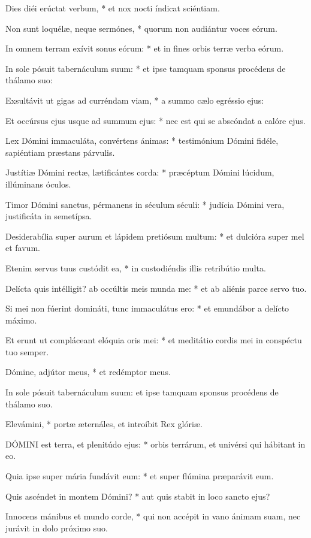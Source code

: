 Dies diéi erúctat verbum, * et nox nocti índicat sciéntiam.

Non sunt loquélæ, neque sermónes, * quorum non audiántur voces eórum.

In omnem terram exívit sonus eórum: * et in fines orbis terræ verba eórum.

In sole pósuit tabernáculum suum: * et ipse tamquam sponsus procédens de thálamo suo:

Exsultávit ut gigas ad curréndam viam, * a summo cælo egréssio ejus:

Et occúrsus ejus usque ad summum ejus: * nec est qui se abscóndat a calóre ejus.

Lex Dómini immaculáta, convértens ánimas: * testimónium Dómini fidéle, sapiéntiam præstans párvulis.

Justítiæ Dómini rectæ, lætificántes corda: * præcéptum Dómini lúcidum, illúminans óculos.

Timor Dómini sanctus, pérmanens in séculum séculi: * judícia Dómini vera, justificáta in semetípsa.

Desiderabília super aurum et lápidem pretiósum multum: * et dulcióra super mel et favum.

Etenim servus tuus custódit ea, * in custodiéndis illis retribútio multa.

Delícta quis intélligit? ab occúltis meis munda me: * et ab aliénis parce servo tuo.

Si mei non fúerint domináti, tunc immaculátus ero: * et emundábor a delícto máximo.

Et erunt ut compláceant elóquia oris mei: * et meditátio cordis mei in conspéctu tuo semper.

Dómine, adjútor meus, * et redémptor meus.

 In sole pósuit tabernáculum suum: et ipse tamquam sponsus procédens de thálamo suo.

 Elevámini, * portæ æternáles, et introíbit Rex glóriæ.


\lettrine[lines=2]{D}{ÓMINI} est terra, et plenitúdo ejus: * orbis terrárum, et univérsi qui hábitant in eo.

Quia ipse super mária fundávit eum: * et super flúmina præparávit eum.

Quis ascéndet in montem Dómini? * aut quis stabit in loco sancto ejus?

Innocens mánibus et mundo corde, * qui non accépit in vano ánimam suam, nec jurávit in dolo próximo suo.

